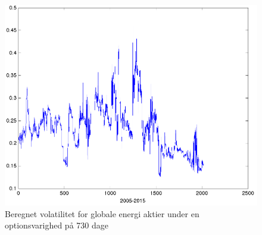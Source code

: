 \documentclass{article}
\begin{document}
\begin{figure}
\centerline{\includegraphics[scale=0.8]{../matlab/figs/implied_vol_730_guan}}
\caption{Beregnet volatilitet for globale energi aktier under en optionsvarighed på 730 dage}
\label{fig:option_vol_730}
\end{figure}
\end{document}
